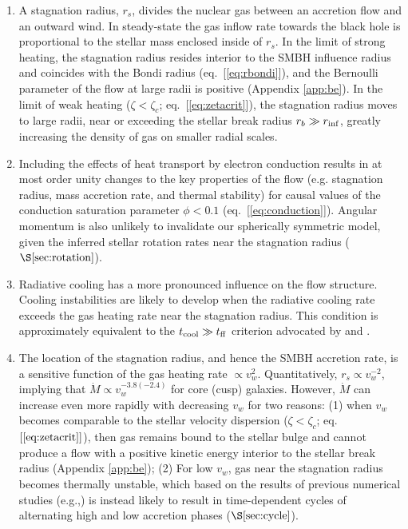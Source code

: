 \documentclass[usenatbib,fleqn]{mn2e}
\newcommand{\Mdot}{\dot{M}}
\newcommand{\rs}{r_s}
\begin{document}
  \begin{enumerate}
  \item A stagnation radius, $\rs$, divides the nuclear gas between an accretion flow and an
    outward wind. In steady-state the gas inflow rate towards the black hole is proportional to the
    stellar mass enclosed inside of $\rs$.  In the limit of strong heating, the stagnation radius resides interior to the SMBH influence radius and coincides with the Bondi radius (eq.~[\ref{eq:rbondi}]), and the Bernoulli parameter of the flow at large radii is positive (Appendix \ref{app:be}).  In the limit of weak heating ($\zeta < \zeta_c$; eq.~[\ref{eq:zetacrit}]), the stagnation radius moves to large radii, near or exceeding the stellar break radius $r_b \gg r_{\rm inf}$, greatly increasing the density of gas on smaller radial scales.  

\item Including the effects of heat transport by electron conduction results in at most order unity changes to the key properties of the flow (e.g. stagnation radius, mass accretion rate, and thermal stability) for causal values of the conduction saturation parameter $\phi < 0.1$ (eq.~[\ref{eq:conduction}]).  Angular momentum is also unlikely to invalidate our spherically symmetric model, given the inferred stellar rotation rates near the stagnation radius ($\S\ref{sec:rotation}$).

\item Radiative cooling has a more pronounced influence on the flow structure.  Cooling instabilities are likely to develop when the radiative cooling rate exceeds the gas heating rate near the stagnation radius.  This condition is approximately equivalent to the $t_{\rm cool} \gg t_{\rm ff}$ criterion advocated by \citet{McCourt+12} and \citet{Li&Bryan14a}.   

  \item The location of the stagnation radius, and hence the SMBH accretion rate, is a sensitive function of the gas heating rate $\propto v_w^{2}$.  Quantitatively, $\rs\propto v_w^{-2}$, implying that $\Mdot\propto  v_w^{-3.8 (-2.4)}$ for core (cusp) galaxies.  However, $\Mdot$ can increase even more rapidly with decreasing $v_w$ for two reasons: (1) when $v_w$ becomes comparable to the stellar velocity dispersion ($\zeta < \zeta_c$; eq.~$[\ref{eq:zetacrit}]$), then gas remains bound to the stellar bulge and cannot produce a flow with a positive kinetic energy interior to the stellar break radius (Appendix \ref{app:be}); (2) For low $v_w$, gas near the stagnation radius becomes thermally unstable, which based on the results of previous numerical studies (e.g.,\citealt{Ciotti+10}) is instead likely to result in time-dependent cycles of alternating high and low accretion phases ($\S\ref{sec:cycle}$).


\end{enumerate}
\end{document}
